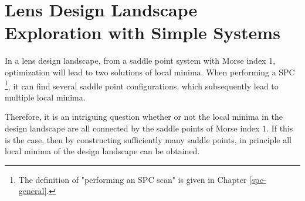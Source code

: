 \setlength{\parskip}{.2em}
\graphicspath{ {./chapter-3/figures/} }
\captionsetup[figure]{labelfont=bf}
\captionsetup{margin=1.5em}
\captionsetup[table]{labelfont=bf}


\chapter{Lens Design Landscape Exploration with Simple Systems}
\label{chapter_SPC_simple_system_landscape}







\noindent 
In a lens design landscape, from a saddle point system with Morse index $1$, optimization will lead to two solutions of local minima.  When performing a SPC \footnote{The definition of "performing an SPC scan" is given in Chapter \ref{spc-general}.}, it can find several saddle point configurations, which subsequently lead to multiple local minima. 

Therefore, it is an intriguing question whether or not the local minima in the design landscape are all connected by the saddle points of Morse index $1$. If this is the case, then by constructing sufficiently many saddle points, in principle all local minima of the design landscape can be obtained. 

